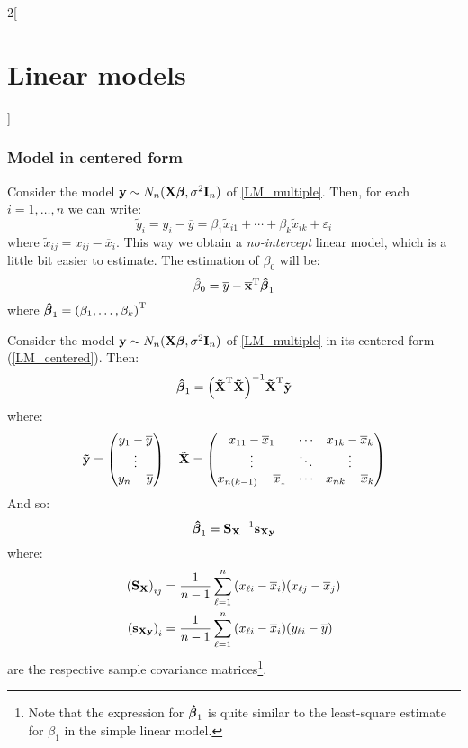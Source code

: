 \documentclass[../../../main_math.tex]{subfiles}
\begin{document}
\begin{multicols}{2}[\section{Linear models}]
  \subsubsection{Model in centered form}
  \begin{definition}
    Consider the model $\boldsymbol{\mathrm{y}}\sim N_n(\boldsymbol{\mathrm{X\beta}},\sigma^2\boldsymbol{\mathrm{I}}_n)$ of \cref{LM_multiple}. Then, for each $i=1,\ldots,n$ we can write:
    \begin{equation}\label{LM_centered}
      \tilde{y}_i=y_i-\overline{y}=\beta_1\tilde{x}_{i1}+\cdots+\beta_k\tilde{x}_{ik}+\varepsilon_i
    \end{equation}
    where $\tilde{x}_{ij}=x_{ij}-\overline{x}_i$. This way we obtain a \emph{no-intercept} linear model, which is a little bit easier to estimate. The estimation of $\beta_0$ will be: $$\hat{\beta}_0=\overline{y}-{\boldsymbol{\mathrm{\overline{x}}}}^{\mathrm{T}}\boldsymbol{\mathrm{\hat\beta}}_{1}$$ where $\boldsymbol{\mathrm{\hat{\beta}}}_1={(\beta_1,\ldots,\beta_k)}^{\mathrm{T}}$
  \end{definition}
  \begin{proposition}
    Consider the model $\boldsymbol{\mathrm{y}}\sim N_n(\boldsymbol{\mathrm{X\beta}},\sigma^2\boldsymbol{\mathrm{I}}_n)$ of \cref{LM_multiple} in its centered form (\cref{LM_centered}). Then: $$\boldsymbol{\mathrm{\hat\beta}}_{1}={\left({\boldsymbol{\mathrm{\tilde{X}}}}^{\mathrm{T}}\boldsymbol{\mathrm{\tilde{X}}}\right)}^{-1}{\boldsymbol{\mathrm{\tilde{X}}}}^{\mathrm{T}}\boldsymbol{\mathrm{\tilde{y}}}$$
    where: $$\boldsymbol{\mathrm{\tilde{y}}}=\begin{pmatrix}
        y_1  -\overline{y} \\
        \vdots             \\
        y_n -\overline{y}
      \end{pmatrix}\quad\boldsymbol{\mathrm{\tilde{X}}}=
      \begin{pmatrix}
        x_{11}-\overline{x}_1      & \cdots & x_{1k}-\overline{x}_k \\
        \vdots                     & \ddots & \vdots                \\
        x_{n(k-1)} -\overline{x}_1 & \cdots & x_{nk}-\overline{x}_k
      \end{pmatrix}$$
    And so: $$\boldsymbol{\mathrm{\hat\beta}}_{1}={\boldsymbol{\mathrm{S}}_{\boldsymbol{\mathrm{X}}}}^{-1}{\boldsymbol{\mathrm{s}}_{\boldsymbol{\mathrm{Xy}}}}$$ where:
    \begin{align*}
      {(\boldsymbol{\mathrm{S}}_{\boldsymbol{\mathrm{X}}})}_{ij} & =\frac{1}{n-1}\sum_{\ell=1}^n{(x_{\ell i}-\overline{x}_i)(x_{\ell j}-\overline{x}_j)} \\
      {(\boldsymbol{\mathrm{s}}_{\boldsymbol{\mathrm{Xy}}})}_i   & =\frac{1}{n-1}\sum_{\ell=1}^n{(x_{\ell i}-\overline{x}_i)(y_{\ell i}-\overline{y})}
    \end{align*}
    are the respective sample covariance matrices\footnote{Note that the expression for $\boldsymbol{\mathrm{\hat\beta}}_{1}$ is quite similar to the least-square estimate for $\beta_1$ in the simple linear model.}.
  \end{proposition}

\end{multicols}
\end{document}
